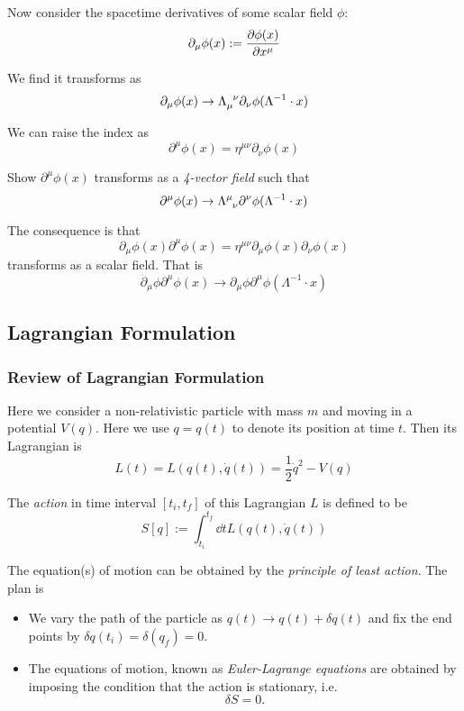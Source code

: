\documentclass[a4paper,11pt]{article}
\begin{document}
	Now consider the spacetime derivatives of some scalar field $\phi$:
	\[
		\partial_\mu \phi(x) := \pdv{\phi(x)}{x^\mu}
	\]

	We find it transforms as 
	\[
		\partial_\mu \phi(x) \to \iLT{\mu}{\nu} \partial_\nu \phi(\Lambda^{-1} \cdot x)
	\]
	
	We can raise the index as 
	\[
		\partial^\mu \phi(x) = \eta^{\mu\nu} \partial_\nu \phi(x)
	\]
	
	\begin{exer}
		Show $\partial^\mu \phi(x)$ transforms as a \emph{4-vector field} such that
		\[
			\partial^\mu \phi(x) \to \LT{\mu}{\nu} \partial^\nu \phi(\Lambda^{-1} \cdot x)
		\]
	\end{exer}

	The consequence is that 
	\[
		\partial_\mu \phi(x) \partial^\mu \phi(x) = \eta^{\mu\nu} \partial_\mu \phi(x) \partial_\nu \phi(x)
	\]
	transforms as a scalar field. That is
	\[
		\partial_\mu \phi \partial^\mu \phi(x) \to \partial_\mu \phi\partial^\mu \phi(\Lambda^{-1} \cdot x)
	\]
	
	\subsection{Lagrangian Formulation} 

	\subsubsection{Review of Lagrangian Formulation}

	Here we consider a non-relativistic particle with mass $m$ and moving in a potential $V(q)$. Here we use $q = q(t)$ to denote its position at time $t$. Then its Lagrangian is
	\begin{equation}
		L(t) = L\left( q(t), \dot{q}(t) \right) = \frac{1}{2} \dot{q}^2 - V(q)
	\end{equation}

	The \emph{action} in time interval $[t_i, t_f]$ of this Lagrangian $L$ is defined to be 
	\begin{equation}
		S[q] := \int_{t_i}^{t_f} \dd{t} L \left( q(t),\dot{q}(t) \right)
	\end{equation}
	
	The equation(s) of motion can be obtained by the \emph{principle of least action}. The plan is
	\begin{itemize}
		\item We vary the path of the particle as $q(t) \to q(t) + \delta q(t)$ and fix the end points by $\delta q(t_i) = \delta(q_f) = 0$.
		\item The equations of motion, known as \emph{Euler-Lagrange equations} are obtained by imposing the condition that the action is stationary, i.e. \[
			\delta S = 0.
		\]
	\end{itemize}
\end{document}
